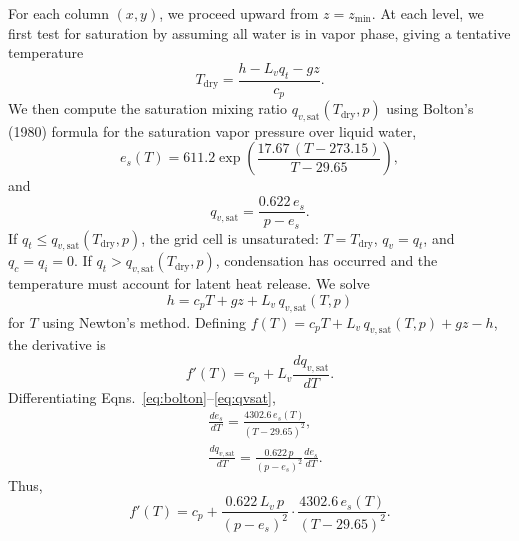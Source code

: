 \documentclass[acp, manuscript, english]{copernicus}
\begin{document}
For each column $(x, y)$, we proceed upward from $z = z_{\min}$. At each level, we first test for saturation by assuming all water is in vapor phase, giving a tentative temperature
%
\begin{equation}
    T_{\mathrm{dry}} = \frac{h - L_v q_t - gz}{c_p}. \label{eq:Tdry}
\end{equation}
%
We then compute the saturation mixing ratio $q_{v,\mathrm{sat}}(T_{\mathrm{dry}}, p)$ using Bolton's (1980) formula for the saturation vapor pressure over liquid water,
%
\begin{equation}
    e_s(T) = 611.2 \exp\!\left(\frac{17.67\,(T - 273.15)}{T - 29.65}\right), \label{eq:bolton}
\end{equation}
%
and
%
\begin{equation}
    q_{v,\mathrm{sat}} = \frac{0.622\, e_s}{p - e_s}. \label{eq:qvsat}
\end{equation}
If $q_t \leq q_{v,\mathrm{sat}}(T_{\mathrm{dry}}, p)$, the grid cell is unsaturated: $T = T_{\mathrm{dry}}$, $q_v = q_t$, and $q_c = q_i = 0$.
If $q_t > q_{v,\mathrm{sat}}(T_{\mathrm{dry}}, p)$, condensation has occurred and the temperature must account for latent heat release. We solve
%
\begin{equation}
    h = c_p T + gz + L_v\, q_{v,\mathrm{sat}}(T, p) \label{eq:h_saturated}
\end{equation}
%
for $T$ using Newton's method. Defining $f(T) = c_p T + L_v\, q_{v,\mathrm{sat}}(T, p) + gz - h$, the derivative is
%
\begin{equation}
    f'(T) = c_p + L_v \frac{dq_{v,\mathrm{sat}}}{dT}. \label{eq:fprime}
\end{equation}
%
Differentiating Eqns.~\ref{eq:bolton}--\ref{eq:qvsat},
\begin{align}
    &\frac{de_s}{dT} = \frac{4302.6\, e_s(T)}{(T - 29.65)^2}, \label{eq:des_dT} \\
    &\frac{dq_{v,\mathrm{sat}}}{dT} = \frac{0.622\, p}{(p - e_s)^2} \frac{de_s}{dT}. \label{eq:dqvsat_dT}
\end{align}
%
Thus,
%
\begin{equation}
    f'(T) = c_p + \frac{0.622\, L_v\, p}{(p - e_s)^2} \cdot \frac{4302.6\, e_s(T)}{(T - 29.65)^2}. \label{eq:fprime_explicit}
\end{equation}

\end{document}
